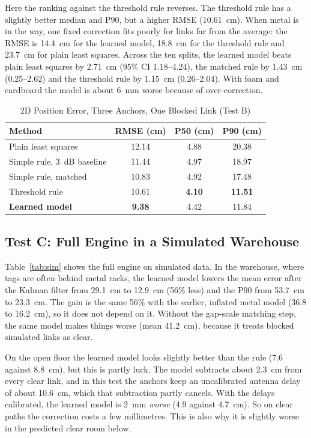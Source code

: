 \documentclass[conference]{IEEEtran}
\begin{document}
Here the ranking against the threshold rule reverses. The threshold rule has
a slightly better median and P90, but a higher RMSE (10.61~cm). When metal is
in the way, one fixed correction fits poorly for links far from the average:
the RMSE is 14.4~cm for the learned model, 18.8~cm for the threshold rule and
23.7~cm for plain least squares. Across the ten splits, the learned model
beats plain least squares by 2.71~cm (95\% CI 1.18--4.24), the matched rule
by 1.43~cm (0.25--2.62) and the threshold rule by 1.15~cm (0.26--2.04). With
foam and cardboard the model is about 6~mm worse because of over-correction.

\begin{table}[htbp]
\caption{2D Position Error, Three Anchors, One Blocked Link (Test B)}
\label{tab:pos}
\centering
\begin{tabular}{lccc}
\toprule
\textbf{Method} & \textbf{RMSE (cm)} & \textbf{P50 (cm)} & \textbf{P90 (cm)} \\
\midrule
Plain least squares        & 12.14 & 4.88 & 20.38 \\
Simple rule, 3~dB baseline & 11.44 & 4.97 & 18.97 \\
Simple rule, matched       & 10.83 & 4.92 & 17.48 \\
Threshold rule             & 10.61 & \textbf{4.10} & \textbf{11.51} \\
\textbf{Learned model}     & \textbf{9.38} & 4.42 & 11.84 \\
\bottomrule
\end{tabular}
\end{table}

\subsection{Test C: Full Engine in a Simulated Warehouse}
Table~\ref{tab:sim} shows the full engine on simulated data. In the
warehouse, where tags are often behind metal racks, the learned model lowers
the mean error after the Kalman filter from 29.1~cm to 12.9~cm (56\% less)
and the P90 from 53.7~cm to 23.3~cm. The gain is the same 56\% with the
earlier, inflated metal model (36.8 to 16.2~cm), so it does not depend on
it. Without the gap-scale matching step, the same model makes things worse
(mean 41.2~cm), because it treats blocked simulated links as clear.

On the open floor the learned model looks slightly better than the rule (7.6
against 8.8~cm), but this is partly luck. The model subtracts about 2.3~cm
from every clear link, and in this test the anchors keep an uncalibrated
antenna delay of about 10.6~cm, which that subtraction partly cancels. With
the delays calibrated, the learned model is 2~mm \emph{worse} (4.9 against
4.7~cm). So on clear paths the correction costs a few millimetres. This is
also why it is slightly worse in the predicted clear room below.
\end{document}
